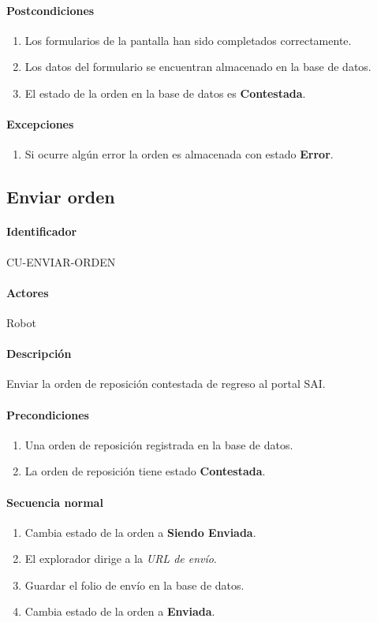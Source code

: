 \paragraph{Postcondiciones}
\begin{enumerate}
  \item Los formularios de la pantalla han sido completados correctamente.
  \item Los datos del formulario se encuentran almacenado en la base de datos.
  \item El estado de la orden en la base de datos es \textbf{Contestada}.
\end{enumerate}
\paragraph{Excepciones}
\begin{enumerate}
  \item Si ocurre algún error la orden es almacenada con estado \textbf{Error}.
\end{enumerate}


\subsection{Enviar orden}
\paragraph{Identificador}
CU-ENVIAR-ORDEN
\paragraph{Actores}
Robot
\paragraph{Descripción}
Enviar la orden de reposición contestada de regreso al portal SAI.
\paragraph{Precondiciones}
\begin{enumerate}
  \item Una orden de reposición registrada en la base de datos.
  \item La orden de reposición tiene estado \textbf{Contestada}.
\end{enumerate}
\paragraph{Secuencia normal}
\begin{enumerate}
  \item Cambia estado de la orden a \textbf{Siendo Enviada}.
  \item El explorador dirige a la \textit{URL de envío}.
  \item Guardar el folio de envío en la base de datos.
  \item Cambia estado de la orden a \textbf{Enviada}.
\end{enumerate}
